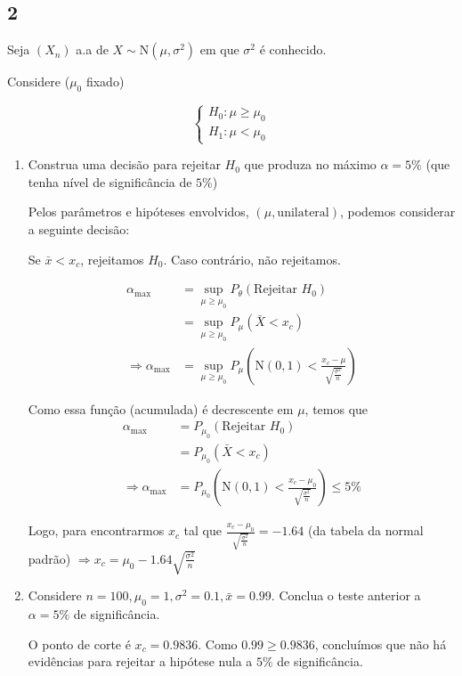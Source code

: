\documentclass[
  letterpaper,
  DIV=11,
  numbers=noendperiod]{scrreprt}
\begin{document}
\subsection{2}\label{section}

Seja \((X_{n})\) a.a de \(X\sim \mathrm{N}(\mu,\sigma^2)\) em que
\(\sigma^2\) é conhecido.

Considere (\(\mu_{0}\) fixado)

\[
\begin{cases}
H_{0} : \mu \geq \mu_{0} \\
H_{1}: \mu < \mu_{0}
\end{cases}
\]

\begin{enumerate}
\def\labelenumi{\arabic{enumi}.}
\item
  Construa uma decisão para rejeitar \(H_0\) que produza no máximo
  \(\alpha = 5\%\) (que tenha nível de significância de \(5\%\))

  Pelos parâmetros e hipóteses envolvidos, \((\mu, \text{unilateral})\),
  podemos considerar a seguinte decisão:

  Se \(\bar{x} < x_{c}\), rejeitamos \(H_{0}\). Caso contrário, não
  rejeitamos.

  \[
   \begin{aligned}
       \alpha_{\max} &= \sup_{\mu \geq \mu_{0}} P_{\theta}(\text{Rejeitar }H_{0}) \\
       &= \sup_{\mu\geq \mu_{0}}P_{\mu}(\bar{X}<x_{c}) \\
       \Rightarrow \alpha_{\max} &=\sup_{\mu\geq \mu_{0}}P_{\mu}\left( \mathrm{N}(0,1)< \frac{{x_{c}-\mu}}
   {\sqrt{\frac{\sigma^2}{n} }} \right)
    \end{aligned}
   \]

  Como essa função (acumulada) é decrescente em \(\mu\), temos que \[
   \begin{aligned}
       \alpha_{\max} &= P_{\mu_{0}}(\text{Rejeitar }H_{0}) \\
       &= P_{\mu_{0}}(\bar{X}<x_{c}) \\
       \Rightarrow \alpha_{\max} &=P_{\mu_{0}}\left( \mathrm{N}(0,1)< \frac{{x_{c}-\mu_{0}}}
   {\sqrt{\frac{\sigma^2}{n} }} \right) \leq 5\%
    \end{aligned}
   \]

  Logo, para encontrarmos \(x_{c}\) tal que
  \(\frac{{x_{c}-\mu_{0}}}{\sqrt{ \frac{\sigma^2}{n} }} = -1.64\) (da
  tabela da normal padrão)
  \(\Rightarrow x_{c} = \mu_{0}-1.64 \sqrt{ \frac{\sigma^2}{n} }\)
\item
  Considere \(n=100, \mu_{0} = 1, \sigma^2 = 0.1, \bar{x}=0.99\).
  Conclua o teste anterior a \(\alpha = 5\%\) de significância.

  O ponto de corte é \(x_{c} = 0.9836\). Como \(0.99 \geq 0.9836\),
  concluímos que não há evidências para rejeitar a hipótese nula a
  \(5\%\) de significância.
\end{enumerate}
\end{document}
